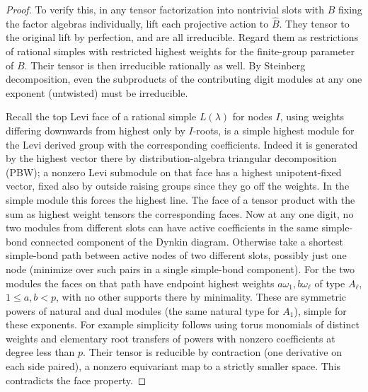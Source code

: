 \begin{proof}
To verify this, in any tensor factorization into nontrivial slots with \(B\) fixing the factor algebras individually, lift each projective action to \(\widehat B\). They tensor to the original lift by perfection, and are all irreducible. Regard them as restrictions of rational simples with restricted highest weights for the finite-group parameter of \(B\). Their tensor is then irreducible rationally as well. By Steinberg decomposition, even the subproducts of the contributing digit modules at any one exponent (untwisted) must be irreducible.

Recall the top Levi face of a rational simple \(L(\lambda)\) for nodes \(I\), using weights differing downwards from highest only by \(I\)-roots, is a simple highest module for the Levi derived group with the corresponding coefficients. Indeed it is generated by the highest vector there by distribution-algebra triangular decomposition (PBW); a nonzero Levi submodule on that face has a highest unipotent-fixed vector, fixed also by outside raising groups since they go off the weights. In the simple module this forces the highest line. The face of a tensor product with the sum as highest weight tensors the corresponding faces. Now at any one digit, no two modules from different slots can have active coefficients in the same simple-bond connected component of the Dynkin diagram. Otherwise take a shortest simple-bond path between active nodes of two different slots, possibly just one node (minimize over such pairs in a single simple-bond component). For the two modules the faces on that path have endpoint highest weights \(a\omega_1,b\omega_\ell\) of type \(A_\ell\), \(1\le a,b<p\), with no other supports there by minimality. These are symmetric powers of natural and dual modules (the same natural type for \(A_1\)), simple for these exponents. For example simplicity follows using torus monomials of distinct weights and elementary root transfers of powers with nonzero coefficients at degree less than \(p\). Their tensor is reducible by contraction (one derivative on each side paired), a nonzero equivariant map to a strictly smaller space. This contradicts the face property.


\end{proof}

